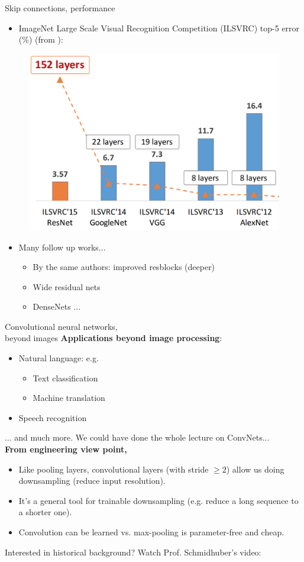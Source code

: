 \begin{frame}{Skip connections, performance}
\begin{itemize}
\item 
ImageNet Large Scale Visual Recognition Competition (ILSVRC) top-5 error (\%) (from ):
\end{itemize}
\begin{figure}
\centering
\includegraphics[width=.5\linewidth]{./figures/image_net.png}
\end{figure}
\begin{itemize}
\item Many follow up works... 
\begin{itemize}
\item By the same authors: improved resblocks  (deeper)
\item Wide residual nets 
\item DenseNets ...
\end{itemize}
\end{itemize}
\end{frame}

\begin{frame}{Convolutional neural networks,\\
beyond images}
\textbf{Applications beyond image processing}:
\begin{itemize}
\item Natural language: e.g.
\begin{itemize}
\item Text classification 
\item Machine translation 
\end{itemize}
\item Speech recognition 
\end{itemize}\vsp
... and much more. We could have done the whole lecture on ConvNets...\\
\vsp
\textbf{From engineering view point,}
\begin{itemize}
\item Like pooling layers, convolutional layers (with stride $\geq 2$) allow us doing downsampling (reduce input resolution).
\item  It's a general tool for trainable downsampling (e.g.
reduce a long sequence to a shorter one).
\item Convolution can be learned vs. max-pooling is parameter-free and cheap.
\end{itemize}
Interested in historical background? Watch Prof. Schmidhuber's video: 
\end{frame}


